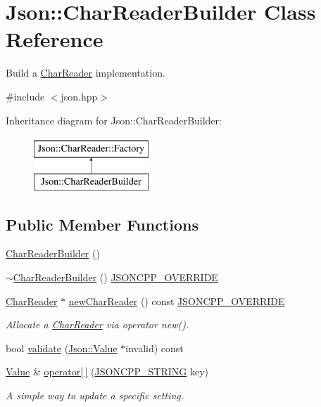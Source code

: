 \hypertarget{classJson_1_1CharReaderBuilder}{}\section{Json\+:\+:Char\+Reader\+Builder Class Reference}
\label{classJson_1_1CharReaderBuilder}


Build a \hyperlink{classJson_1_1CharReader}{Char\+Reader} implementation.  




{\ttfamily \#include $<$json.\+hpp$>$}

Inheritance diagram for Json\+:\+:Char\+Reader\+Builder\+:\begin{figure}[H]
\begin{center}
\leavevmode
\includegraphics[height=2.000000cm]{classJson_1_1CharReaderBuilder}
\end{center}
\end{figure}
\subsection*{Public Member Functions}
\begin{DoxyCompactItemize}
\item 
\hyperlink{classJson_1_1CharReaderBuilder_a6e197b69a2ede3d87b03b9c5c78ba46a}{Char\+Reader\+Builder} ()
\item 
\hyperlink{classJson_1_1CharReaderBuilder_ae8226503f5b947e9d618c39dd992c85c}{$\sim$\+Char\+Reader\+Builder} () \hyperlink{json_8hpp_a824d6199c91488107e443226fa6022c5}{J\+S\+O\+N\+C\+P\+P\+\_\+\+O\+V\+E\+R\+R\+I\+DE}
\item 
\hyperlink{classJson_1_1CharReader}{Char\+Reader} $\ast$ \hyperlink{classJson_1_1CharReaderBuilder_a3a262fcc76c1eb8eebfd4718fb4e9722}{new\+Char\+Reader} () const \hyperlink{json_8hpp_a824d6199c91488107e443226fa6022c5}{J\+S\+O\+N\+C\+P\+P\+\_\+\+O\+V\+E\+R\+R\+I\+DE}
\begin{DoxyCompactList}\small\item\em Allocate a \hyperlink{classJson_1_1CharReader}{Char\+Reader} via operator new(). \end{DoxyCompactList}\item 
bool \hyperlink{classJson_1_1CharReaderBuilder_a3d233735a1e4b3c9a2cb9c68f972c02a}{validate} (\hyperlink{classJson_1_1Value}{Json\+::\+Value} $\ast$invalid) const 
\item 
\hyperlink{classJson_1_1Value}{Value} \& \hyperlink{classJson_1_1CharReaderBuilder_a84b35ef443340c06c0aa7b47851d8d86}{operator\mbox{[}$\,$\mbox{]}} (\hyperlink{json_8hpp_a1e723f95759de062585bc4a8fd3fa4be}{J\+S\+O\+N\+C\+P\+P\+\_\+\+S\+T\+R\+I\+NG} key)
\begin{DoxyCompactList}\small\item\em A simple way to update a specific setting. \end{DoxyCompactList}\end{DoxyCompactItemize}
